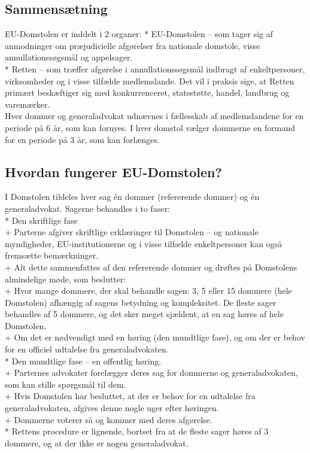 \documentclass[]{book}
\begin{document}
\hypertarget{sammenstning}{%
\subsection{Sammensætning}\label{sammenstning}}

EU-Domstolen er inddelt i 2 organer:
* EU-Domstolen -- som tager sig af anmodninger om præjudicielle afgørelser fra nationale domstole, visse annullationssøgsmål og appelsager.\\
* Retten -- som træffer afgørelse i annullationssøgsmål indbragt af enkeltpersoner, virksomheder og i visse tilfælde medlemslande. Det vil i praksis sige, at Retten primært beskæftiger sig med konkurrenceret, statsstøtte, handel, landbrug og varemærker.\\
Hver dommer og generaladvokat udnævnes i fællesskab af medlemslandene for en periode på 6 år, som kan fornyes. I hver domstol vælger dommerne en formand for en periode på 3 år, som kan forlænges.

\hypertarget{hvordan-fungerer-eu-domstolen}{%
\subsection{Hvordan fungerer EU-Domstolen?}\label{hvordan-fungerer-eu-domstolen}}

I Domstolen tildeles hver sag én dommer (refererende dommer) og én generaladvokat. Sagerne behandles i to faser:\\
* Den skriftlige fase\\
+ Parterne afgiver skriftlige erklæringer til Domstolen -- og nationale myndigheder, EU-institutionerne og i visse tilfælde enkeltpersoner kan også fremsætte bemærkninger.\\
+ Alt dette sammenfattes af den refererende dommer og drøftes på Domstolens almindelige møde, som beslutter:\\
+ Hvor mange dommere, der skal behandle sagen: 3, 5 eller 15 dommere (hele Domstolen) afhængig af sagens betydning og kompleksitet. De fleste sager behandles af 5 dommere, og det sker meget sjældent, at en sag høres af hele Domstolen.\\
+ Om det er nødvendigt med en høring (den mundtlige fase), og om der er behov for en officiel udtalelse fra generaladvokaten.\\
* Den mundtlige fase -- en offentlig høring.\\
+ Parternes advokater forelægger deres sag for dommerne og generaladvokaten, som kan stille spørgsmål til dem.\\
+ Hvis Domstolen har besluttet, at der er behov for en udtalelse fra generaladvokaten, afgives denne nogle uger efter høringen.\\
+ Dommerne voterer så og kommer med deres afgørelse.\\
* Rettens procedure er lignende, bortset fra at de fleste sager høres af 3 dommere, og at der ikke er nogen generaladvokat.
\end{document}
